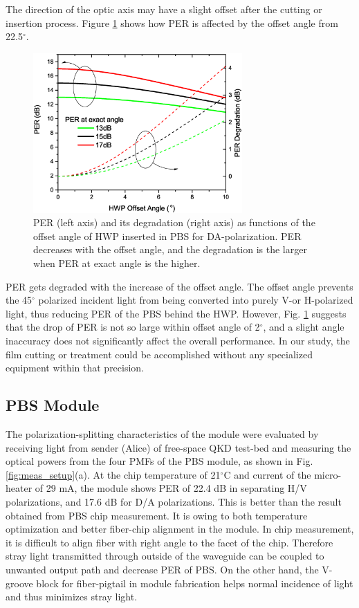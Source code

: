 \documentclass[letterpaper, 10pt]{article}
\begin{document}
The direction of the optic axis may have a slight offset after the cutting  or  insertion process.
Figure \ref{fig:angle_offset} shows how PER is affected by the offset angle from 22.5$^\circ$.
\begin{figure}
  \centering
  \includegraphics[width=8cm]{./offset_angle}
  \caption{PER (left axis) and its degradation (right axis) as functions of the offset angle of HWP inserted in PBS for DA-polarization. PER decreases with the offset angle, and the degradation is the larger when PER at exact angle is the higher.}
  \label{fig:angle_offset}
\end{figure}
PER gets degraded with the increase of the offset angle.
The offset angle prevents the 45$^\circ$ polarized incident light from being converted into purely V-or H-polarized light, thus reducing PER of the PBS behind the HWP.
However, Fig. \ref{fig:angle_offset} suggests that the drop of PER is not so large within  offset angle of 2$^\circ$, and  a slight angle inaccuracy does not significantly affect the overall performance.
In our study, the film cutting or treatment could be accomplished without any specialized equipment within that precision.

\subsection{PBS Module}

The polarization-splitting characteristics of the module were evaluated by receiving light from sender (Alice) of free-space QKD test-bed and measuring the optical powers from the four PMFs of the PBS module, as shown in Fig. \ref{fig:meas_setup}(a).
At the chip temperature of 21$^\circ$C and current of the micro-heater of 29 mA, the module shows PER of 22.4 dB in separating H/V polarizations, and 17.6 dB for D/A polarizations.
This is better than the result obtained from PBS chip measurement.
It is owing to both temperature optimization and better fiber-chip alignment in the module.
In chip measurement, it is difficult to align fiber with right angle to the facet of the chip.
Therefore stray light transmitted through outside of the waveguide can be coupled to unwanted output path and decrease PER of PBS.
On the other hand, the V-groove block for fiber-pigtail in module fabrication helps normal incidence of light and thus minimizes stray light.
\end{document}
